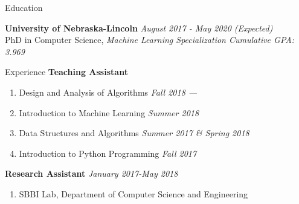 \documentclass{resume} %
\newenvironment{cvEnum}
{ \begin{enumerate}[]
    \setlength{\itemsep}{0pt}
    \setlength{\parskip}{0pt}
    \setlength{\parsep}{0pt}     }
{ \end{enumerate}                  }
\begin{document}

\begin{rSection}{Education}

{\bf University of Nebraska-Lincoln} \hfill {\em August 2017 - May
  2020 (Expected)}
\\ PhD in Computer Science, \it{Machine Learning Specialization} \hfill { Cumulative GPA: 3.969 }

\end{rSection}

\begin{rSection}{Experience}
{\bf Teaching Assistant}
\begin{cvEnum}
\item Design and Analysis of Algorithms  \hfill {\em Fall 2018 ---}
\item Introduction to Machine Learning \hfill {\em Summer 2018}
\item Data Structures and Algorithms \hfill {\em Summer 2017 \& Spring 2018}
\item Introduction to Python Programming \hfill {\em Fall 2017}
\end{cvEnum}
{\bf Research Assistant} \hfill {\em January 2017-May 2018}
\begin{cvEnum}
\item SBBI Lab, Department of Computer Science and Engineering
    \end{cvEnum}

\end{rSection}



\end{document}
